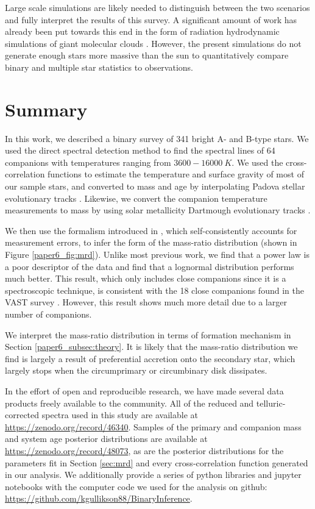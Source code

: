 Large scale simulations are likely needed to distinguish between the two scenarios and fully interpret the results of this survey. A significant amount of work has already been put towards this end in the form of radiation hydrodynamic simulations of giant molecular clouds \citep{Bate2012, Krumholz2012}. However, the present simulations do not generate enough stars more massive than the sun to quantitatively compare binary and multiple star statistics to observations. 


\section{Summary}

In this work, we described a binary survey of 341 bright A- and B-type stars. We used the direct spectral detection method \citep{Gullikson2016} to find the spectral lines of 64 companions with temperatures ranging from $3600 - 16000\ K$.  We used the cross-correlation functions to estimate the temperature and surface gravity of most of our sample stars, and converted to mass and age by interpolating Padova stellar evolutionary tracks \citep{Bressan2012}. Likewise, we convert the companion temperature measurements to mass by using solar metallicity Dartmough evolutionary tracks \citep{Dotter2008}. 

We then use the formalism introduced in \citet{Foreman2014}, which self-consistently accounts for measurement errors, to infer the form of the mass-ratio distribution (shown in Figure \ref{paper6_fig:mrd}). Unlike most previous work, we find that a power law is a poor descriptor of the data and find that a lognormal distribution performs much better. This result, which only includes close companions since it is a spectroscopic technique, is consistent with the 18 close companions found in the VAST survey \citep{DeRosa2014}. However, this result shows much more detail due to a larger number of companions. 

We interpret the mass-ratio distribution in terms of formation mechanism in Section \ref{paper6_subsec:theory}. It is likely that the mass-ratio distribution we find is largely a result of preferential accretion onto the secondary star, which largely stops when the circumprimary or circumbinary disk dissipates.

In the effort of open and reproducible research, we have made several data products freely available to the community. All of the reduced and telluric-corrected spectra used in this study are available at \url{https://zenodo.org/record/46340}. Samples of the primary and companion mass and system age posterior distributions are available at \url{https://zenodo.org/record/48073}, as are the posterior distributions for the parameters fit in Section \ref{sec:mrd} and every cross-correlation function generated in our analysis. We additionally provide a series of python libraries and jupyter notebooks with the computer code we used for the analysis on github: \url{https://github.com/kgullikson88/BinaryInference}.




